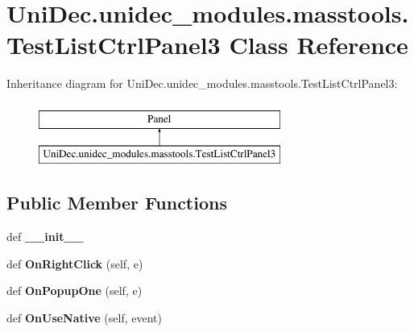 \hypertarget{class_uni_dec_1_1unidec__modules_1_1masstools_1_1_test_list_ctrl_panel3}{}\section{Uni\+Dec.\+unidec\+\_\+modules.\+masstools.\+Test\+List\+Ctrl\+Panel3 Class Reference}
\label{class_uni_dec_1_1unidec__modules_1_1masstools_1_1_test_list_ctrl_panel3}
Inheritance diagram for Uni\+Dec.\+unidec\+\_\+modules.\+masstools.\+Test\+List\+Ctrl\+Panel3\+:\begin{figure}[H]
\begin{center}
\leavevmode
\includegraphics[height=2.000000cm]{class_uni_dec_1_1unidec__modules_1_1masstools_1_1_test_list_ctrl_panel3}
\end{center}
\end{figure}
\subsection*{Public Member Functions}
\begin{DoxyCompactItemize}
\item 
\hypertarget{class_uni_dec_1_1unidec__modules_1_1masstools_1_1_test_list_ctrl_panel3_ae9f0a2a88fe40b45051f85620629d843}{}def {\bfseries \+\_\+\+\_\+init\+\_\+\+\_\+}\label{class_uni_dec_1_1unidec__modules_1_1masstools_1_1_test_list_ctrl_panel3_ae9f0a2a88fe40b45051f85620629d843}

\item 
\hypertarget{class_uni_dec_1_1unidec__modules_1_1masstools_1_1_test_list_ctrl_panel3_a57be6301cefd5ec4a25280c7c0fb9b76}{}def {\bfseries On\+Right\+Click} (self, e)\label{class_uni_dec_1_1unidec__modules_1_1masstools_1_1_test_list_ctrl_panel3_a57be6301cefd5ec4a25280c7c0fb9b76}

\item 
\hypertarget{class_uni_dec_1_1unidec__modules_1_1masstools_1_1_test_list_ctrl_panel3_a39cd290fb2710606616aecf01c3e4e43}{}def {\bfseries On\+Popup\+One} (self, e)\label{class_uni_dec_1_1unidec__modules_1_1masstools_1_1_test_list_ctrl_panel3_a39cd290fb2710606616aecf01c3e4e43}

\item 
\hypertarget{class_uni_dec_1_1unidec__modules_1_1masstools_1_1_test_list_ctrl_panel3_ae05e72a0d0415af3011932a5a7c0a306}{}def {\bfseries On\+Use\+Native} (self, event)\label{class_uni_dec_1_1unidec__modules_1_1masstools_1_1_test_list_ctrl_panel3_ae05e72a0d0415af3011932a5a7c0a306}

\end{DoxyCompactItemize}
